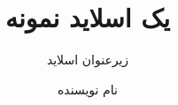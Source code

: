 \documentclass{beamer}
\begin{document}
\title{یک اسلاید نمونه}
\subtitle{زیرعنوان اسلاید}
\author{نام نویسنده}


\begin{frame}
\maketitle
\end{frame}

\begin{frame}
\ptext[1-2]
\end{frame}

\end{document}
